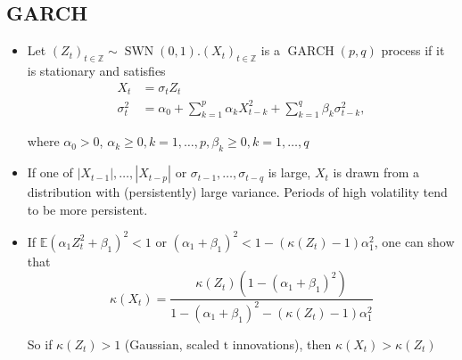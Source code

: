 \subsection*{GARCH}
\begin{itemize}[leftmargin=*]
    \item Let $\left(Z_{t}\right)_{t \in \mathbb{Z}} \sim \operatorname{SWN}(0,1) .\left(X_{t}\right)_{t \in \mathbb{Z}}$ is a $\operatorname{GARCH}(p, q)$ process if it is stationary and satisfies
$$
\begin{aligned}
X_{t} &=\sigma_{t} Z_{t} \\
\sigma_{t}^{2} &=\alpha_{0}+\sum_{k=1}^{p} \alpha_{k} X_{t-k}^{2}+\sum_{k=1}^{q} \beta_{k} \sigma_{t-k}^{2},
\end{aligned}
$$

where $\alpha_{0}>0$, $\alpha_{k} \geq 0, k=1, \ldots, p, \beta_{k} \geq 0, k=1, \ldots, q$
    \item If one of $\left|X_{t-1}\right|, \ldots,\left|X_{t-p}\right|$ or $\sigma_{t-1}, \ldots, \sigma_{t-q}$ is large, $X_{t}$ is drawn from a distribution with (persistently) large variance. Periods of high volatility tend to be more persistent.
    \item If $\mathbb{E}\left(\alpha_{1} Z_{t}^{2}+\beta_{1}\right)^{2}<1$ or $\left(\alpha_{1}+\beta_{1}\right)^{2}<1-\left(\kappa\left(Z_{t}\right)-1\right) \alpha_{1}^{2}$, one can show that
$$
\kappa\left(X_{t}\right)=\frac{\kappa\left(Z_{t}\right)\left(1-\left(\alpha_{1}+\beta_{1}\right)^{2}\right)}{1-\left(\alpha_{1}+\beta_{1}\right)^{2}-\left(\kappa\left(Z_{t}\right)-1\right) \alpha_{1}^{2}}
$$

So if $\kappa\left(Z_{t}\right)>1$ (Gaussian, scaled $\mathrm{t}$ innovations), then $\kappa\left(X_{t}\right)>\kappa\left(Z_{t}\right)$

\end{itemize}









